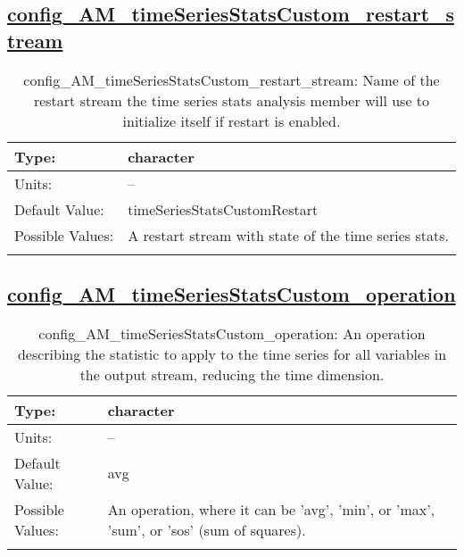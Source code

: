 \subsection[config\_AM\_timeSeriesStatsCustom\_restart\_stream]{\hyperref[sec:nm_tab_AM_timeSeriesStatsCustom]{config\_AM\_timeSeriesStatsCustom\_restart\_stream}}
\label{subsec:nm_sec_config_AM_timeSeriesStatsCustom_restart_stream}
\begin{center}
\begin{longtable}{| p{2.0in} || p{4.0in} |}
    \hline
    Type: & character \\
    \hline
    Units: & -- \\
    \hline
    Default Value: & timeSeriesStatsCustomRestart \\
    \hline
    Possible Values: & A restart stream with state of the time series stats. \\
    \hline
    \caption{config\_AM\_timeSeriesStatsCustom\_restart\_stream: Name of the restart stream the time series stats analysis member will use to initialize itself if restart is enabled.}
\end{longtable}
\end{center}
\subsection[config\_AM\_timeSeriesStatsCustom\_operation]{\hyperref[sec:nm_tab_AM_timeSeriesStatsCustom]{config\_AM\_timeSeriesStatsCustom\_operation}}
\label{subsec:nm_sec_config_AM_timeSeriesStatsCustom_operation}
\begin{center}
\begin{longtable}{| p{2.0in} || p{4.0in} |}
    \hline
    Type: & character \\
    \hline
    Units: & -- \\
    \hline
    Default Value: & avg \\
    \hline
    Possible Values: & An operation, where it can be 'avg', 'min', or 'max', 'sum', or 'sos' (sum of squares). \\
    \hline
    \caption{config\_AM\_timeSeriesStatsCustom\_operation: An operation describing the statistic to apply to the time series for all variables in the output stream, reducing the time dimension.}
\end{longtable}
\end{center}
